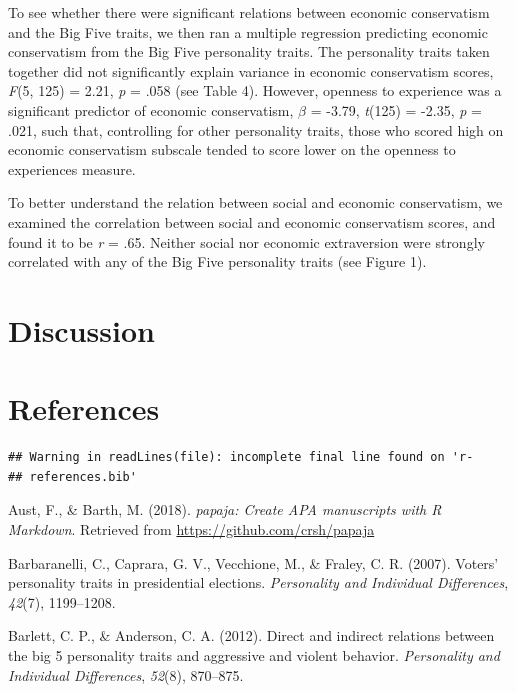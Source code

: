 \documentclass[man]{apa6}
\begin{document}
To see whether there were significant relations between economic
conservatism and the Big Five traits, we then ran a multiple regression
predicting economic conservatism from the Big Five personality traits.
The personality traits taken together did not significantly explain
variance in economic conservatism scores, \emph{F}(5, 125) = 2.21,
\emph{p} = .058 (see Table 4). However, openness to experience was a
significant predictor of economic conservatism, \(\beta\) = -3.79,
\emph{t}(125) = -2.35, \emph{p} = .021, such that, controlling for other
personality traits, those who scored high on economic conservatism
subscale tended to score lower on the openness to experiences measure.

To better understand the relation between social and economic
conservatism, we examined the correlation between social and economic
conservatism scores, and found it to be \emph{r} = .65. Neither social
nor economic extraversion were strongly correlated with any of the Big
Five personality traits (see Figure 1).

\section{Discussion}\label{discussion}

\newpage

\section{References}\label{references}

\begin{verbatim}
## Warning in readLines(file): incomplete final line found on 'r-
## references.bib'
\end{verbatim}

\begingroup
\setlength{\parindent}{-0.5in} \setlength{\leftskip}{0.5in}

\hypertarget{refs}{}
\hypertarget{ref-R-papaja}{}
Aust, F., \& Barth, M. (2018). \emph{papaja: Create APA manuscripts with
R Markdown}. Retrieved from \url{https://github.com/crsh/papaja}

\hypertarget{ref-barbaranelli2007voters}{}
Barbaranelli, C., Caprara, G. V., Vecchione, M., \& Fraley, C. R.
(2007). Voters' personality traits in presidential elections.
\emph{Personality and Individual Differences}, \emph{42}(7), 1199--1208.

\hypertarget{ref-barlett2012direct}{}
Barlett, C. P., \& Anderson, C. A. (2012). Direct and indirect relations
between the big 5 personality traits and aggressive and violent
behavior. \emph{Personality and Individual Differences}, \emph{52}(8),
870--875.
\end{document}
